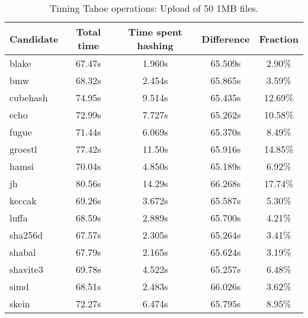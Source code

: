 \begin{table}[h]
  \centering
  \begin{tabular}{ | l | c | c | c | c | }
    \hline
    Candidate & Total time & Time spent hashing & Difference & Fraction \\ \hline
    blake & 67.47s & 1.960s & 65.509s & 2.90\% \\ \hline
    bmw & 68.32s & 2.454s & 65.865s & 3.59\% \\ \hline
    cubehash & 74.95s & 9.514s & 65.435s & 12.69\% \\ \hline
    echo & 72.99s & 7.727s & 65.262s & 10.58\% \\ \hline
    fugue & 71.44s & 6.069s & 65.370s & 8.49\% \\ \hline
    groestl & 77.42s & 11.50s & 65.916s & 14.85\% \\ \hline
    hamsi & 70.04s & 4.850s & 65.189s & 6.92\% \\ \hline
    jh & 80.56s & 14.29s & 66.268s & 17.74\% \\ \hline
    keccak & 69.26s & 3.672s & 65.587s & 5.30\% \\ \hline
    luffa & 68.59s & 2.889s & 65.700s & 4.21\% \\ \hline
    sha256d & 67.57s & 2.305s & 65.264s & 3.41\% \\ \hline
    shabal & 67.79s & 2.165s & 65.624s & 3.19\% \\ \hline
    shavite3 & 69.78s & 4.522s & 65.257s & 6.48\% \\ \hline
    simd & 68.51s & 2.483s & 66.026s & 3.62\% \\ \hline
    skein & 72.27s & 6.474s & 65.795s & 8.95\% \\ \hline
  \end{tabular}
  \caption{Timing Tahoe operations: Upload of 50 1MB files.}
  \label{tbl:hashingtimes:put1mb}
\end{table}

